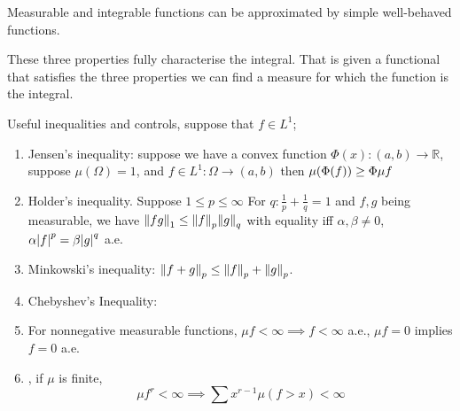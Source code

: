     
\begin{thm}
    Measurable and integrable functions can be approximated by simple well-behaved functions.   
\end{thm}
\begin{thm}
    
\end{thm}

\begin{remark}
    These three properties fully characterise the integral. That is given a functional that satisfies the three properties we can find a measure for which the function is the integral. 
\end{remark}


\begin{thm}
    Useful inequalities and controls, suppose that \(f \in L^{1}\);
    \begin{enumerate}
        \item Jensen's inequality: suppose we have a convex function \(\Phi(x): (a,b) \to \mathbb{R}\), suppose \(\mu(\Omega)=1\), and \(f \in L^{1}: \Omega \to (a,b) \) then \(\mu\pqty{\Phi(f)} \geq \Phi \mu f\)
        \item Holder's inequality. Suppose \(1 \leq p \leq \infty\) For \(q: \frac{1}{p} + \frac{1}{q} = 1\) and \(f,g\) being measurable, we have \(\norm{fg}_{1} \leq \norm{f}_{p} \norm{g}_{q}\) with equality iff \(\alpha, \beta \neq 0\), \(\alpha \abs{f}^{p} = \beta \abs{g}^{q}\) a.e. 
        \item Minkowski's inequality: \(\norm{f + g}_{p} \leq \norm{f}_{p} + \norm{g}_{p}\).
        \item Chebyshev's Inequality: 
        \item For nonnegative measurable functions, \(\mu f < \infty  \implies f < \infty\) a.e., \(\mu f = 0\) implies \(f = 0\) a.e. 
        \item {}, if \(\mu\) is finite, 
        \begin{equation*}
            \mu f^{r} < \infty \implies \sum x^{r - 1} \mu(f> x) < \infty
        \end{equation*}
    \end{enumerate}    
\end{thm}

